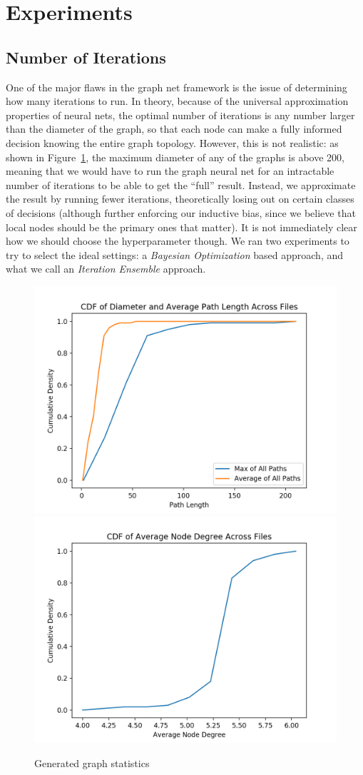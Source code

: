 \section{Experiments}
\label{sec:experiments}

\subsection{Number of Iterations}
One of the major flaws in the graph net framework is the issue of determining how many iterations to run.
In theory, because of the universal approximation properties of neural nets, the optimal number of iterations is any number larger than the diameter of the graph, so that each node can make a fully informed decision knowing the entire graph topology.
However, this is not realistic: as shown in Figure~\ref{fig:dataset-graph-stats}, the maximum diameter of any of the graphs is above 200, meaning that we would have to run the graph neural net for an intractable number of iterations to be able to get the ``full'' result.
Instead, we approximate the result by running fewer iterations, theoretically losing out on certain classes of decisions (although further enforcing our inductive bias, since we believe that local nodes should be the primary ones that matter).
It is not immediately clear how we should choose the \textsc{\NIter} hyperparameter though.
We ran two experiments to try to select the ideal settings: a \emph{Bayesian Optimization} based approach, and what we call an \emph{Iteration Ensemble} approach.

\begin{figure}
  \centering
  \includegraphics[width=0.49\linewidth]{img/diameter}
  \includegraphics[width=0.49\linewidth]{img/node_degree}
  \caption{Generated graph statistics}
  \label{fig:dataset-graph-stats}
\end{figure}


